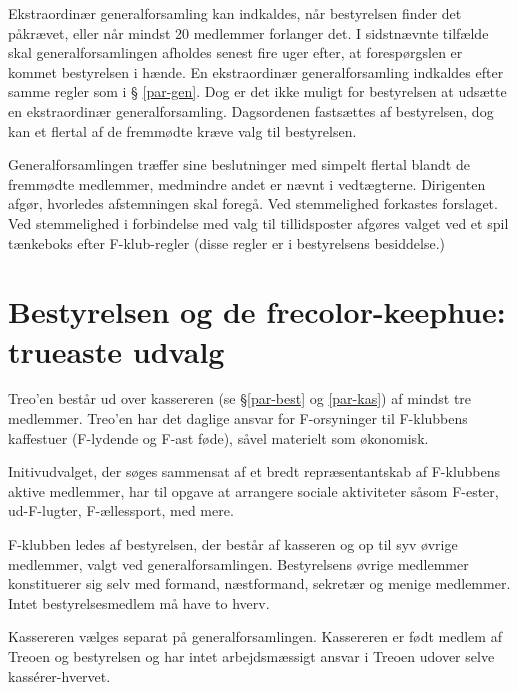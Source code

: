 \documentclass[a4paper,12pt,danish]{article}
\begin{document}
\begin{list}
\item Ekstraordinær generalforsamling kan indkaldes, når
  bestyrelsen finder det påkrævet, eller når mindst 20 medlemmer 
  forlanger det. I sidstnævnte tilfælde skal generalforsamlingen afholdes 
	senest fire uger efter, at forespørgslen er kommet bestyrelsen i
	hænde.
  En ekstraordinær generalforsamling indkaldes efter samme regler som i \S
  \ref{par-gen}. Dog er det ikke muligt for bestyrelsen at udsætte en ekstraordinær
  generalforsamling. Dagsordenen fastsættes af bestyrelsen, dog kan et flertal 
  af de fremmødte kræve valg til bestyrelsen. 
  
\item \label{gen-regler} Generalforsamlingen træffer sine beslutninger med 
  simpelt flertal blandt de fremmødte medlemmer, medmindre andet er nævnt i vedtægterne.
  Dirigenten afgør, hvorledes afstemningen skal foregå.
  Ved stemmelighed forkastes forslaget. 
  Ved stemmelighed i forbindelse med valg til tillidsposter afgøres valget 
  ved et spil tænkeboks efter F-klub-regler (disse regler er i bestyrelsens besiddelse.)

\section{Bestyrelsen og de frecolor-keephue: trueaste udvalg}

\item Treo'en består ud over kassereren (se \S \ref{par-best} og
  \ref{par-kas}) af mindst tre medlemmer. Treo'en har det daglige
  ansvar for F-orsyninger til F-klubbens kaffestuer (F-lydende og F-ast føde),
  såvel materielt som økonomisk.
  
\item Initivudvalget, der søges sammensat af et bredt
  repræsentantskab af F-klubbens aktive medlemmer, har til opgave at
  arrangere sociale aktiviteter såsom F-ester, ud-F-lugter,
  F-ællessport, med mere.
  
\item \label{par-best} F-klubben ledes af bestyrelsen, der består
  af kasseren og op til syv øvrige medlemmer, valgt ved
  generalforsamlingen.  Bestyrelsens øvrige medlemmer konstituerer sig
  selv med formand, næstformand, sekretær og menige medlemmer. Intet
  bestyrelsesmedlem må have to hverv.

\item \label{par-kas} Kassereren vælges separat på
  generalforsamlingen.  Kassereren er født medlem af Treoen og
  bestyrelsen og har intet arbejdsmæssigt ansvar i Treoen udover
  selve kass\'{e}rer-hvervet.


\end{list}
\end{document}
